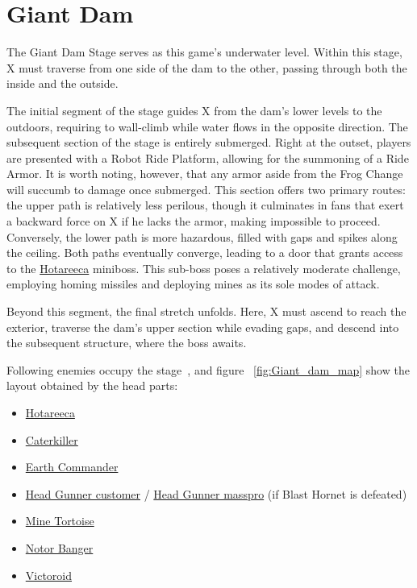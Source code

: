 \section{Giant Dam}
The Giant Dam Stage serves as this game's underwater level. Within this stage, X must traverse from one side of the dam to the other, passing through both the inside and the outside.

The initial segment of the stage guides X from the dam's lower levels to the outdoors, requiring to wall-climb while water flows in the opposite direction.
The subsequent section of the stage is entirely submerged. Right at the outset, players are presented with a Robot Ride Platform, allowing for the summoning of a Ride Armor. It is worth noting, however, that any armor aside from the Frog Change will succumb to damage once submerged. This section offers two primary routes: the upper path is relatively less perilous, though it culminates in fans that exert a backward force on X if he lacks the armor, making impossible to proceed. Conversely, the lower path is more hazardous, filled with gaps and spikes along the ceiling. Both paths eventually converge, leading to a door that grants access to the \hyperlink{miniboss:Hotareeca}{Hotareeca} miniboss. This sub-boss poses a relatively moderate challenge, employing homing missiles and deploying mines as its sole modes of attack.

Beyond this segment, the final stretch unfolds. Here, X must ascend to reach the exterior, traverse the dam's upper section while evading gaps, and descend into the subsequent structure, where the boss awaits.

Following enemies occupy the stage~\cite{wiki:Giant_Dam}, and figure ~\ref{fig:Giant_dam_map} show the layout obtained by the head parts:
\begin{itemize}
	
\item \hyperlink{miniboss:Hotareeca}{Hotareeca}
\item \hyperlink{enem:Caterkiller}{Caterkiller}
\item \hyperlink{enem:Earth_Commander}{Earth Commander}
\item \hyperlink{enem:Head_Gunner_customer}{Head Gunner customer} / \hyperlink{enem:Head_Gunner_masspro}{Head Gunner masspro} (if Blast Hornet is defeated) 
\item \hyperlink{enem:Mine_Tortoise}{Mine Tortoise}
\item \hyperlink{enem:Notor_Banger}{Notor Banger}
\item \hyperlink{enem:Victoroid}{Victoroid}
\end{itemize}


